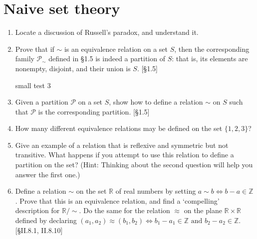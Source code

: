 \section{Naive set theory}
\begin{enumerate}
    \item Locate a discussion of Russell's paradox, and understand it.
    \item Prove that if $\sim$ is an equivalence relation on a set $S$, then the corresponding family $\mathcal{P}_{\sim}$ defined in \S1.5 is indeed a partition of $S$: that is, its elements are nonempty, disjoint, and their union is $S$. [\S1.5]

          \begin{solution}
            \lipsum[1]

            small test 3
          \end{solution}

    \item Given a partition $\mathcal{P}$ on a set $S$, show how to define a relation $\sim$ on $S$ such that $\mathcal{P}$ is the corresponding partition. [\S1.5]
    \item How many different equivalence relations may be defined on the set $\{1, 2, 3\}$?
    \item Give an example of a relation that is reflexive and symmetric but not transitive. What happens if you attempt to use this relation to define a partition on the set? (Hint: Thinking about the second question will help you answer the first one.)
    \item Define a relation $\sim$ on the set $\mathbb{R}$ of real numbers by setting $a \sim b \iff b-a \in \mathbb{Z}$. Prove that this is an equivalence relation, and find a `compelling' description for $\mathbb{R}/\sim$. Do the same for the relation $\approx$ on the plane $\mathbb{R} \times \mathbb{R}$ defined by declaring $(a_1, a_2) \approx (b_1, b_2) \iff b_1 - a_1 \in \mathbb{Z} \text{ and } b_2 - a_2 \in \mathbb{Z}$. [\S II.8.1, II.8.10]
\end{enumerate}
